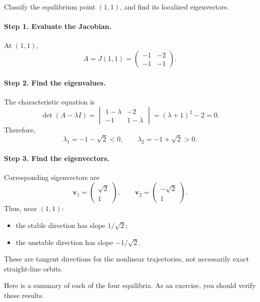 \documentclass[10pt,letterpaper]{article}
\begin{document}
\begin{example}[2]{
Classify the equilibrium point $(1,1)$, and find its localized eigenvectors.
}

\paragraph{Step 1. Evaluate the Jacobian.}
At $(1,1)$,
\[
A=J(1,1)=
\begin{pmatrix}
-1&-2\\
-1&-1
\end{pmatrix}.
\]

\paragraph{Step 2. Find the eigenvalues.}
The characteristic equation is
\[
\det(A-\lambda I)
=
\begin{vmatrix}
1-\lambda &-2\\
-1&1-\lambda
\end{vmatrix}
=(\lambda+1)^2-2=0.
\]
Therefore,
\[
\lambda_1=-1-\sqrt2<0,
\qquad
\lambda_2=-1+\sqrt2>0.
\]

\paragraph{Step 3. Find the eigenvectors.}
Corresponding eigenvectors are
\[
\mathbf{v}_1=
\begin{pmatrix}\sqrt2\\1\end{pmatrix},
\qquad
\mathbf{v}_2=
\begin{pmatrix}-\sqrt2\\1\end{pmatrix}.
\]
Thus, near $(1,1)$:
\begin{itemize}
    \item the stable direction has slope $1/\sqrt2$;
    \item the unstable direction has slope $-1/\sqrt2$.
\end{itemize}
These are tangent directions for the nonlinear
trajectories, not necessarily exact straight-line orbits.
\end{example}

Here is a summary of each of the four equilibria. As an exercise, you should verify these results.
\end{document}
